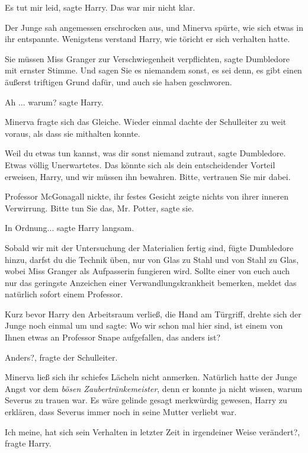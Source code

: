 \glqq{}Es tut mir leid\grqq{}, sagte Harry. \glqq{}Das war mir nicht
klar.\grqq{}

Der Junge sah angemessen erschrocken aus, und Minerva spürte, wie sich etwas in
ihr entspannte. Wenigstens verstand Harry, wie töricht er sich verhalten hatte.

\glqq{}Sie müssen Miss Granger zur Verschwiegenheit verpflichten\grqq{}, sagte
Dumbledore mit ernster Stimme. \glqq{}Und sagen Sie es niemandem sonst, es sei
denn, es gibt einen äußerst triftigen Grund dafür, und auch sie haben
geschworen.\grqq{}

\glqq{}Ah ... warum?\grqq{} sagte Harry.

Minerva fragte sich das Gleiche. Wieder einmal dachte der Schulleiter zu weit
voraus, als dass sie mithalten konnte.

\glqq{}Weil du etwas tun kannst, was dir sonst niemand zutraut\grqq{}, sagte
Dumbledore. \glqq{}Etwas völlig Unerwartetes. Das könnte sich als dein
entscheidender Vorteil erweisen, Harry, und wir müssen ihn bewahren. Bitte,
vertrauen Sie mir dabei.\grqq{}

Professor McGonagall nickte, ihr festes Gesicht zeigte nichts von ihrer inneren
Verwirrung. \glqq{}Bitte tun Sie das, Mr. Potter\grqq{}, sagte sie.

\glqq{}In Ordnung...\grqq{} sagte Harry langsam.

\glqq{}Sobald wir mit der Untersuchung der Materialien fertig sind\grqq{}, fügte
Dumbledore hinzu, \glqq{}darfst du die Technik üben, nur von Glas zu Stahl und
von Stahl zu Glas, wobei Miss Granger als Aufpasserin fungieren wird. Sollte
einer von euch auch nur das geringste Anzeichen einer Verwandlungskrankheit
bemerken, meldet das natürlich sofort einem Professor.\grqq{}

Kurz bevor Harry den Arbeitsraum verließ, die Hand am Türgriff, drehte sich der
Junge noch einmal um und sagte: \glqq{}Wo wir schon mal hier sind, ist einem von
Ihnen etwas an Professor Snape aufgefallen, das anders ist?\grqq{}

\glqq{}Anders?\grqq{}, fragte der Schulleiter.

Minerva ließ sich ihr schiefes Lächeln nicht anmerken. Natürlich hatte der Junge
Angst vor dem \emph{ \glqq{}bösen Zaubertränkemeister\grqq{}}, denn er konnte ja
nicht wissen, warum Severus zu trauen war. Es wäre gelinde gesagt merkwürdig
gewesen, Harry zu erklären, dass Severus immer noch in seine Mutter verliebt
war.

\glqq{}Ich meine, hat sich sein Verhalten in letzter Zeit in irgendeiner Weise
verändert?\grqq{}, fragte Harry.


